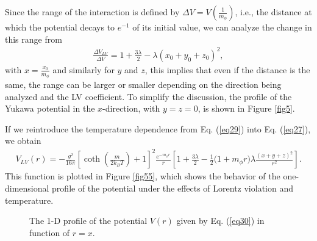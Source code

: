 \documentclass[11pt,showpacs,preprintnumbers,amsmath,amssymb,prd,nofootinbib,superscriptaddress]{revtex4-2}
\begin{document}
Since the range of the interaction is defined by $\Delta V = V\left(\frac{1}{m_{\phi}}\right)$, i.e., the distance at which the potential decays to $e^{-1}$ of its initial value, we can analyze the change in this range from
\begin{eqnarray}
    \frac{\Delta V_{LV}}{\Delta V}=1+\frac{3\lambda}{2}-\lambda(x_0+y_0+z_0)^2,
\end{eqnarray}
with $x = \frac{x_0}{m_{\phi}}$ and similarly for $y$ and $z$, this implies that even if the distance is the same, the range can be larger or smaller depending on the direction being analyzed and the LV coefficient. To simplify the discussion, the profile of the Yukawa potential in the $x$-direction, with $y = z = 0$, is shown in Figure \ref{fig5}.

If we reintroduce the temperature dependence from Eq. (\ref{eq29}) into Eq. (\ref{eq27}), we obtain
\begin{eqnarray}
    V_{LV}(r)=-\frac{g^2}{16\pi}\left[\coth{\left(\frac{m}{2k_BT}\right)}+1\right]^2\frac{e^{-m_{\phi}r}}{r}\left[1+\frac{3\lambda}{2}-\frac{1}{2}\biggl(1+m_\phi r\biggr)\lambda\frac{(x+y+z)^2}{r^2}\right].\label{eq30}
\end{eqnarray}
This function is plotted in Figure \ref{fig55}, which shows the behavior of the one-dimensional profile of the potential under the effects of Lorentz violation and temperature.
\begin{figure}[ht]
    \centering
    \caption{The 1-D profile of the potential $V(r)$ given by Eq. (\ref{eq30}) in function of $r=x$.}
   \end{figure}
\end{document}
